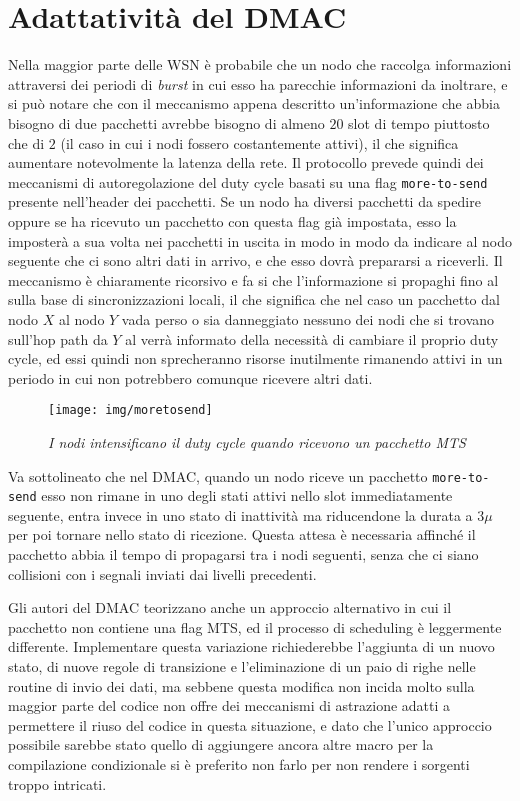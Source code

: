 \documentclass[twoside,11pt,a4paper,italian,openany]{book}
\begin{document}
\section{Adattatività del DMAC}
Nella maggior parte delle WSN è probabile che un nodo che raccolga informazioni attraversi dei
periodi di \emph{burst} in cui esso ha parecchie informazioni da inoltrare, e si può notare che 
con il meccanismo appena descritto un'informazione che abbia bisogno di due pacchetti avrebbe 
bisogno di almeno $20$ slot di tempo piuttosto che di $2$ (il caso in cui i nodi fossero 
costantemente attivi), il che significa aumentare notevolmente la latenza della rete. 
Il protocollo prevede quindi dei meccanismi di autoregolazione del duty cycle basati su una flag 
\texttt{more-to-send} presente nell'header dei pacchetti. 
Se un nodo ha diversi pacchetti da spedire oppure se ha ricevuto un pacchetto con questa flag
già impostata, esso la imposterà a sua volta nei pacchetti in uscita in modo in modo da 
indicare al nodo seguente che ci sono altri dati in arrivo, e che esso dovrà prepararsi a 
riceverli. Il meccanismo è chiaramente ricorsivo e fa si che l'informazione si propaghi fino 
al \sink sulla base di sincronizzazioni locali, il che significa che nel caso un pacchetto dal 
nodo $X$ al nodo $Y$ vada perso o sia danneggiato nessuno dei nodi che si trovano sull'hop path da
$Y$ al \sink verrà informato della necessità di cambiare il proprio duty cycle, ed essi quindi 
non sprecheranno risorse inutilmente rimanendo attivi in un periodo in cui non potrebbero 
comunque ricevere altri dati. 
\begin{figure}
\texttt{[image: img/moretosend]}
\caption{\emph{I nodi intensificano il duty cycle quando ricevono un pacchetto MTS}}
\end{figure}

Va sottolineato che nel DMAC, quando un nodo riceve un pacchetto \texttt{more-to-send} esso non 
rimane in uno degli stati attivi nello slot immediatamente seguente, entra invece in uno stato di
inattività ma riducendone la durata a  
$3\mu$ per poi tornare nello stato di ricezione. Questa attesa è necessaria affinché il 
pacchetto abbia il tempo di propagarsi tra i nodi seguenti, senza che ci siano collisioni con i
segnali inviati dai livelli precedenti. 

Gli autori del DMAC teorizzano anche un approccio alternativo in cui il pacchetto non contiene 
una flag MTS,  ed il processo di scheduling è leggermente differente. 
Implementare questa variazione richiederebbe l'aggiunta di un nuovo stato, di 
nuove regole di transizione e l'eliminazione di un paio di righe nelle routine di invio dei dati,
ma sebbene questa modifica non incida molto sulla maggior parte del codice \nesc non offre dei 
meccanismi di astrazione adatti a permettere il riuso del codice in questa situazione, e dato 
che l'unico approccio possibile sarebbe stato quello di aggiungere ancora altre macro 
per la compilazione condizionale si è preferito non farlo per non rendere i sorgenti troppo 
intricati. 
\end{document}
